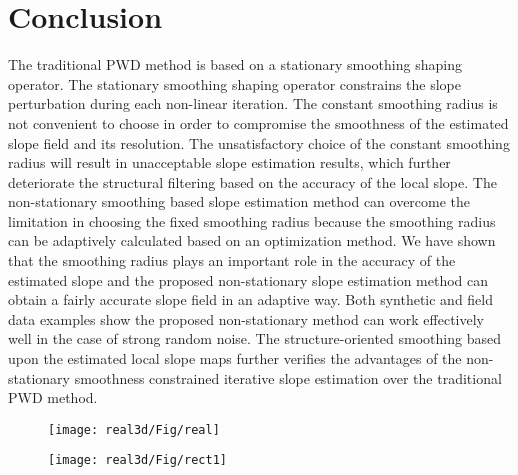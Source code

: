 \section{Conclusion}
The traditional PWD method is based on a stationary smoothing shaping operator. The stationary smoothing shaping operator constrains the slope perturbation during each non-linear iteration. The constant smoothing radius is not convenient to choose in order to compromise the smoothness of the estimated slope field and its resolution. The unsatisfactory choice of the constant smoothing radius will result in unacceptable slope estimation results, which further deteriorate the structural filtering based on the accuracy of the local slope. The non-stationary smoothing based slope estimation method can overcome the limitation in choosing the fixed smoothing radius because the smoothing radius can be adaptively calculated based on an optimization method. We have shown that the smoothing radius plays an important role in the accuracy of the estimated slope and the proposed non-stationary slope estimation method can obtain a fairly accurate slope field in an adaptive way. Both synthetic and field data examples show the proposed non-stationary method can work effectively well in the case of strong random noise. The structure-oriented smoothing based upon the estimated local slope maps further verifies the advantages of the non-stationary smoothness constrained iterative slope estimation over the traditional PWD method. 


\begin{figure}[htb!]
\centering
\texttt{[image: real3d/Fig/real]}
\caption{ }
\label{fig:real}
\end{figure}

\begin{figure}[htb!]
\centering
\texttt{[image: real3d/Fig/rect1]}
\caption{}
\label{fig:rect1}
\end{figure}
   

\begin{figure}[htb!]
\centering
{}
\caption{}
\label{fig:real-s2dip1,real-s1dip1,real-ndip1}
\end{figure}


